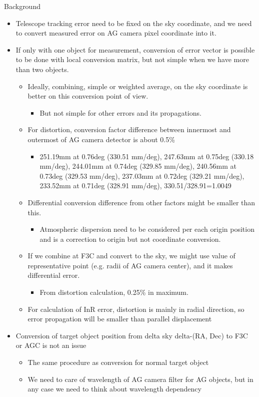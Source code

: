 \documentclass[a4paper,notitlepage]{article}
\begin{document}
Background
\begin{itemize}
  \item Telescope tracking error need to be fixed on the sky coordinate, and we need to convert measured error on AG camera pixel coordinate into it.
  \item If only with one object for measurement, conversion of error vector is possible to be done with local conversion matrix, but not simple when we have more than two objects.
  \begin{itemize}
    \item Ideally, combining, simple or weighted average, on the sky coordinate is better on this conversion point of view.
    \begin{itemize}
      \item But not simple for other errors and its propagations.
    \end{itemize}
    \item For distortion, conversion factor difference between innermost and outermost of AG camera detector is about 0.5\%
    \begin{itemize}
      \item 251.19mm at 0.76deg (330.51 mm/deg), 247.63mm at 0.75deg (330.18 mm/deg), 244.01mm at 0.74deg (329.85 mm/deg), 240.56mm at 0.73deg (329.53 mm/deg), 237.03mm at 0.72deg (329.21 mm/deg), 233.52mm at 0.71deg (328.91 mm/deg), 330.51/328.91=1.0049
    \end{itemize}
    \item Differential conversion difference from other factors might be smaller than this.
    \begin{itemize}
      \item Atmospheric dispersion need to be considered per each origin position and is a correction to origin but not coordinate conversion. 
    \end{itemize}
    \item If we combine at F3C and convert to the sky, we might use value of representative point (e.g. radii of AG camera center), and it makes differential error.
    \begin{itemize}
      \item From distortion calculation, 0.25\% in maximum.
    \end{itemize}
    \item For calculation of InR error, distortion is mainly in radial direction, so error propagation will be smaller than parallel displacement
  \end{itemize}
  \item Conversion of target object position from delta sky delta-(RA, Dec) to F3C or AGC is not an issue
  \begin{itemize}
    \item The same procedure as conversion for normal target object
    \item We need to care of wavelength of AG camera filter for AG objects, but in any case we need to think about wavelength dependency
  \end{itemize}
\end{itemize}
\end{document}
